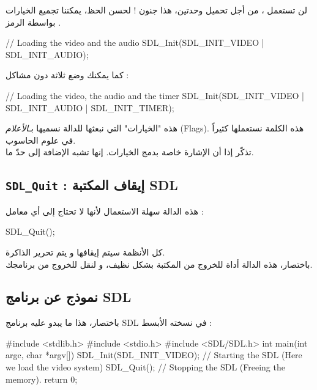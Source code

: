 لن تستعمل
،
من أجل تحميل وحدتين، هذا جنون ! لحسن الحظ، يمكننا تجميع الخيارات بواسطة الرمز
\InlineCode{|}.

\begin{Csource}
// Loading the video and the audio
SDL_Init(SDL_INIT_VIDEO | SDL_INIT_AUDIO);
\end{Csource}

كما يمكنك وضع ثلاثة دون مشاكل :

\begin{Csource}
// Loading the video, the audio and the timer
SDL_Init(SDL_INIT_VIDEO | SDL_INIT_AUDIO | SDL_INIT_TIMER);
\end{Csource}

\begin{information}
هذه "الخيارات" التي نبعثها للدالة 
نسميها بـ\textit{الأعلام}
(\textenglish{Flags}).
هذه الكلمة نستعملها كثيراً في علوم الحاسوب.\\
تذكّر إذا أن الإشارة
\InlineCode{|}
خاصة بدمج الخيارات. إنها تشبه الإضافة إلى حدّ ما.
\end{information}

\subsection{\texttt{SDL\_Quit} : إيقاف المكتبة \textenglish{SDL}}

هذه الدالة سهلة الاستعمال لأنها لا تحتاج إلى أي معامل :

\begin{Csource}
SDL_Quit();
\end{Csource}

كل الأنظمة سيتم إيقافها و يتم تحرير الذاكرة.\\
باختصار، هذه الدالة أداة للخروج من المكتبة بشكل نظيف، و لنقل للخروج من برنامجك.

\subsection{نموذج عن برنامج \textenglish{SDL}}
باختصار، هذا ما يبدو عليه برنامج
\textenglish{SDL}
في نسخته الأبسط :

\begin{Csource}
#include <stdlib.h>
#include <stdio.h>
#include <SDL/SDL.h>
int main(int argc, char *argv[])
{
	SDL_Init(SDL_INIT_VIDEO); // Starting the SDL (Here we load the video system)
	SDL_Quit(); // Stopping the SDL (Freeing the memory).
	return 0;
}
\end{Csource}

